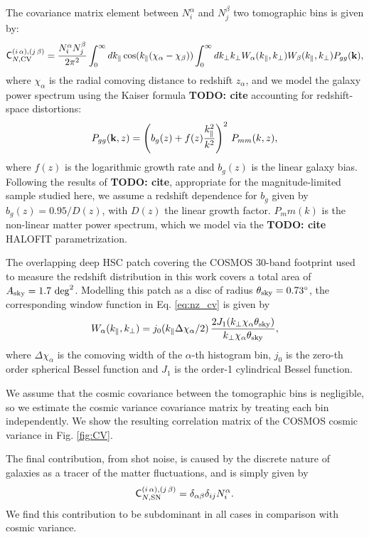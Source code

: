 \documentclass[a4paper,11pt]{article}
\newcommand{\todo}[1]{{\bf TODO: #1}}
\begin{document}
        The covariance matrix element between $N^\alpha_i$ and $N^\beta_j$ two tomographic bins is given by:
        \begin{equation}\label{eq:nz_cv}
          {\sf C}_{N,{\rm CV}}^{(i\,\alpha),(j\,\beta)}=\frac{N^\alpha_iN^\beta_j}{2\pi^2} \int_0^\infty dk_\parallel \cos(k_\parallel(\chi_\alpha-\chi_\beta))\int_0^\infty dk_\perp k_\perp W_\alpha(k_\parallel,k_\perp)W_\beta(k_\parallel,k_\perp)P_{gg}({\bf k}),
        \end{equation}
        where $\chi_\alpha$ is the radial comoving distance to redshift $z_\alpha$, and we model the galaxy power spectrum using the Kaiser formula \todo{cite} accounting for redshift-space distortions:
        \begin{equation}
          P_{gg}({\bf k},z)=\left(b_g(z)+f(z)\frac{k_\parallel^2}{k^2}\right)^2\,P_{mm}(k,z),
        \end{equation}
        where $f(z)$ is the logarithmic growth rate and $b_g(z)$ is the linear galaxy bias. Following the results of \todo{cite}, appropriate for the magnitude-limited sample studied here, we assume a redshift dependence for $b_g$ given by $b_g(z) = 0.95/D(z)$, with $D(z)$ the linear growth factor. $P_mm(k)$ is the non-linear matter power spectrum, which we model via the \todo{cite} HALOFIT parametrization.

        The overlapping deep HSC patch covering the COSMOS 30-band footprint used to measure the redshift distribution in this work covers a total area of $A_{\rm sky} = 1.7 \ {\rm deg}^2$. Modelling this patch as a disc of radius $\theta_{\rm sky}=0.73^\circ$, the corresponding window function in Eq. \ref{eq:nz_cv} is given by
        \begin{equation}
          W_\alpha(k_\parallel,k_\perp)=j_0(k_\parallel\Delta\chi_\alpha/2)\,\frac{2 J_1(k_\perp \chi_\alpha\theta_{\rm sky})}{k_\perp \chi_\alpha\theta_{\rm sky}},
        \end{equation}
        where $\Delta\chi_\alpha$ is the comoving width of the $\alpha$-th histogram bin, $j_0$ is the zero-th order spherical Bessel function and $J_1$ is the order-1 cylindrical Bessel function.

        We assume that the cosmic covariance between the tomographic bins is negligible, so we estimate the cosmic variance covariance matrix by treating each bin independently. We show the resulting correlation matrix of the COSMOS cosmic variance in Fig. \ref{fig:CV}.
        
        The final contribution, from shot noise, is caused by the discrete nature of galaxies as a tracer of the matter fluctuations, and is simply given by
        \begin{equation}
          {\sf C}^{(i\,\alpha),(j\,\beta)}_{N,{\rm SN}}=\delta_{\alpha\beta}\delta_{ij}N^\alpha_i.
        \end{equation}
        We find this contribution to be subdominant in all cases in comparison with cosmic variance.
\end{document}
